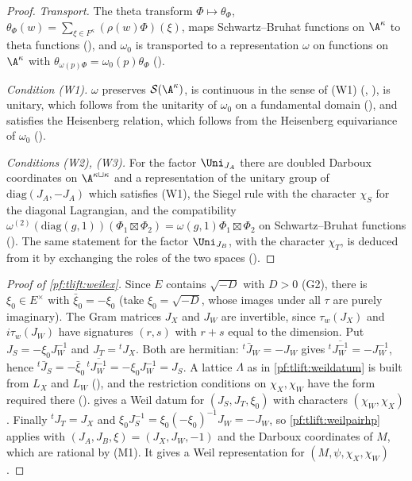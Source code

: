 \begin{proof}
\emph{Transport.} The theta transform $\Phi\mapsto\theta_\Phi$, $\theta_\Phi(w)=\sum_{\xi\in F^\kappa}(\rho(w)\Phi)(\xi)$, maps
Schwartz--Bruhat functions on $\A^\kappa$ to theta functions (),
and $\omega_0$ is transported to a representation $\omega$ on functions on $\A^\kappa$ with
$\theta_{\omega(p)\Phi}=\omega_0(p)\theta_\Phi$ ().

\emph{Condition (W1).} $\omega$ preserves $\tliftS(\A^\kappa)$, is continuous in the sense of (W1)
(, ),
is unitary, which follows from the unitarity of $\omega_0$ on a fundamental domain
(), and satisfies the Heisenberg relation, which follows from
the Heisenberg equivariance of $\omega_0$ ().

\emph{Conditions (W2), (W3).} For the factor $\Uni_{J_A}$ there are doubled Darboux coordinates on
$\A^{\kappa\sqcup\kappa}$ and a representation of the unitary group of $\mathrm{diag}(J_A,-J_A)$ which satisfies (W1), the Siegel
rule with the character $\chi_S$ for the diagonal Lagrangian, and the compatibility
$\omega^{(2)}(\mathrm{diag}(g,1))(\Phi_1\boxtimes\Phi_2)=\omega(g,1)\Phi_1\boxtimes\Phi_2$ on Schwartz--Bruhat functions
(). The same statement for the factor $\Uni_{J_B}$, with the
character $\chi_T$, is deduced from it by exchanging the roles of the two spaces
().
\end{proof}

\begin{proof}[Proof of \cref{pf:tlift:weilex}]
Since $E$ contains $\sqrt{-D}$ with $D>0$ (G2), there is $\xi_0\in E^\times$ with $\bar\xi_0=-\xi_0$
(take $\xi_0=\sqrt{-D}$, whose images under all $\tau$ are purely imaginary). The Gram matrices $J_X$ and $J_W$ are invertible, since
$\tau_w(J_X)$ and $i\tau_w(J_W)$ have signatures $(r,s)$ with $r+s$ equal to the dimension. Put
$J_S=-\xi_0J_W^{-1}$ and $J_T={}^tJ_X$. Both are hermitian: ${}^t\bar J_W=-J_W$ gives
${}^t\overline{J_W^{-1}}=-J_W^{-1}$, hence ${}^t\bar J_S=-\bar\xi_0\,{}^t\overline{J_W^{-1}}=-\xi_0J_W^{-1}=J_S$. A lattice $\Lambda$ as in
\cref{pf:tlift:weildatum} is built from $L_X$ and $L_W$ (), and the restriction
conditions on $\chi_X,\chi_W$ have the form required there
().  gives a Weil datum for
$(J_S,J_T,\xi_0)$ with characters $(\chi_W,\chi_X)$. Finally ${}^tJ_T=J_X$ and
$\xi_0J_S^{-1}=\xi_0(-\xi_0)^{-1}J_W=-J_W$, so \cref{pf:tlift:weilpairhp} applies with $(J_A,J_B,\xi)=(J_X,J_W,-1)$ and the
Darboux coordinates of $M$, which are rational by (M1). It gives a Weil representation for $(M,\psi,\chi_X,\chi_W)$.
\end{proof}

